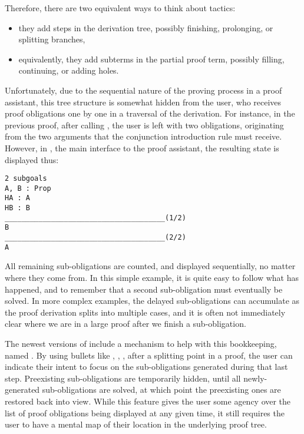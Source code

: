 Therefore, there are two equivalent ways to think about tactics:

\begin{itemize}

  \item they add steps in the derivation tree, possibly finishing, prolonging,
or splitting branches,

  \item equivalently, they add subterms in the partial proof term, possibly
filling, continuing, or adding holes.

\end{itemize}

Unfortunately, due to the sequential nature of the proving process in a proof
assistant, this tree structure is somewhat hidden from the user, who receives
proof obligations one by one in a traversal of the derivation.  For instance, in
the previous proof, after calling , the user is left with two
obligations, originating from the two arguments that the conjunction
introduction rule must receive.  However, in \CoqIDE{}, the main interface to
the proof assistant, the resulting state is displayed thus:

\begin{verbatim}
2 subgoals
A, B : Prop
HA : A
HB : B
______________________________________(1/2)
B
______________________________________(2/2)
A
\end{verbatim}

All remaining sub-obligations are counted, and displayed sequentially, no matter
where they come from.  In this simple example, it is quite easy to follow what
has happened, and to remember that a second sub-obligation must eventually be
solved.  In more complex examples, the delayed sub-obligations can accumulate as
the proof derivation splits into multiple cases, and it is often not immediately
clear where we are in a large proof after we finish a sub-obligation.

The newest versions of \Coq{} include a mechanism to help with this bookkeeping,
named .  By using bullets like \coqinline{+}, \coqinline{-},
\coqinline{*}, after a splitting point in a proof, the user can indicate their
intent to focus on the sub-obligations generated during that last step.
Preexisting sub-obligations are temporarily hidden, until all newly-generated
sub-obligations are solved, at which point the preexisting ones are restored
back into view.  While this feature gives the user some agency over the list of
proof obligations being displayed at any given time, it still requires the user
to have a mental map of their location in the underlying proof tree.

